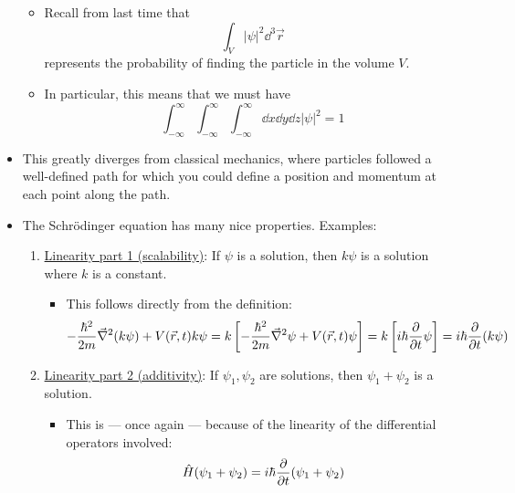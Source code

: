 \documentclass[../notes.tex]{subfiles}
\begin{document}
\begin{itemize}
    \begin{itemize}
        \item Recall from last time that
        \begin{equation*}
            \int_V|\psi|^2\dd^3\vec{r}
        \end{equation*}
        represents the probability of finding the particle in the volume $V$.
        \item In particular, this means that we must have
        \begin{equation*}
            \int_{-\infty}^\infty\int_{-\infty}^\infty\int_{-\infty}^\infty\dd{x}\dd{y}\dd{z}|\psi|^2 = 1
        \end{equation*}
    \end{itemize}
    \item This greatly diverges from classical mechanics, where particles followed a well-defined path for which you could define a position and momentum at each point along the path.
    \item The Schr\"{o}dinger equation has many nice properties. Examples:
    \begin{enumerate}
        \item \underline{Linearity part 1 (scalability)}: If $\psi$ is a solution, then $k\psi$ is a solution where $k$ is a constant.
        \begin{itemize}
            \item This follows directly from the definition:
            \begin{equation*}
                -\frac{\hbar^2}{2m}\vec{\nabla}^2(k\psi)+V(\vec{r},t)k\psi = k\left[ -\frac{\hbar^2}{2m}\vec{\nabla}^2\psi+V(\vec{r},t)\psi \right] = k\left[ i\hbar\pdv{t}\psi \right] = i\hbar\pdv{t}(k\psi)
            \end{equation*}
        \end{itemize}
        \item \underline{Linearity part 2 (additivity)}: If $\psi_1,\psi_2$ are solutions, then $\psi_1+\psi_2$ is a solution.
        \begin{itemize}
            \item This is --- once again --- because of the linearity of the differential operators involved:
            \begin{equation*}
                \hat{H}(\psi_1+\psi_2) = i\hbar\pdv{t}(\psi_1+\psi_2)
            \end{equation*}
        \end{itemize}
    \end{enumerate}

\end{itemize}
\end{document}
